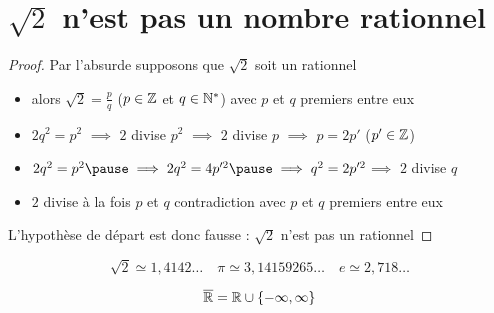\section*{$\sqrt2$ n'est pas un nombre rationnel}

\begin{frame}

\end{frame}


\begin{frame}
\begin{proposition}
\end{proposition}

\pause
\begin{proof}
\pause
Par l'absurde supposons que $\sqrt{2}$ soit un rationnel
\pause
\medskip
\begin{itemize}
\setlength{\itemsep}{5pt}
  \item alors  $\sqrt{2}=\frac pq$ ($p\in \mathbb{Z}$ et $q\in \mathbb{N}^*$) \pause avec $p$ et $q$ premiers entre eux
\pause
  \item $2q^2=p^2$ \pause $\implies$ $2$ divise $p^2$ \pause $\implies$ $2$ divise $p$ \pause$\implies$ $p=2p'$ ($p'\in \mathbb{Z}$)
 \pause
  \item $2q^2=p^2 \pause \implies 2q^2=4p'^2 \pause \implies q^2=2p'^2$\pause $\implies$ $2$ divise $q$
 \pause
  \item $2$ divise à la fois $p$ et $q$ \pause contradiction avec  $p$ et $q$ premiers entre eux
\end{itemize}
\pause
\medskip
L'hypothèse de départ est donc fausse :  
\pause $\sqrt2$ n'est pas un rationnel
\end{proof}

\end{frame}


\begin{frame}
\pause
$$\sqrt{2}\simeq 1,4142\ldots \quad 
\pi\simeq 3,14159265\ldots \quad e\simeq 2,718\ldots$$
\pause
\begin{mydefinition}
\[ \overline{\mathbb{R}}=\mathbb{R}\cup\{-\infty,\infty\}  \]
\end{mydefinition}
\end{frame}

